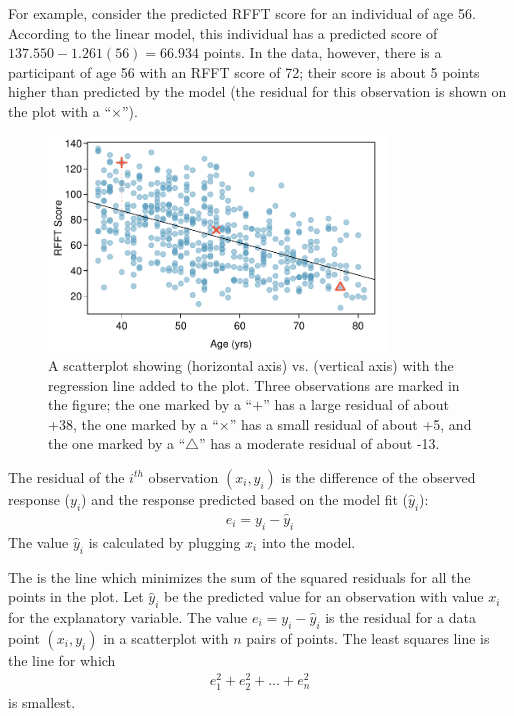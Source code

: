 For example, consider the predicted RFFT score for an individual of age 56. According to the linear model, this individual has a predicted score of $137.550 - 1.261(56) = 66.934$ points. In the data, however, there is a participant of age 56 with an RFFT score of 72; their score is about 5 points higher than predicted by the model (the residual for this observation is shown on the plot with a ``$\times$'').

\begin{figure}[h!]
	\centering
	\includegraphics[width=0.8\textwidth]
	{ch_simple_linear_regression_oi_biostat/figures/statinsResid/statinsResid.pdf}
	\caption{A scatterplot showing  (horizontal axis) vs.  (vertical axis) with the regression line added to the plot. Three observations are marked in the figure; the one marked by a ``$+$'' has a large residual of about +38, the one marked by a ``$\times$'' has a small residual of about +5, and the one marked by a ``$\triangle$'' has a moderate residual of about -13.}
	\label{statinsResid}
\end{figure}

\begin{termBox}{
The residual of the $i^{th}$ observation $(x_i, y_i)$ is the difference of the observed response ($y_i$) and the response predicted based on the model fit ($\widehat{y}_i$):
\begin{eqnarray*}
e_i = y_i - \widehat{y}_i
\end{eqnarray*}
The value $\widehat{y}_i$ is calculated by plugging $x_i$ into the model.}
\end{termBox}

The  is the line which minimizes the sum of the squared residuals for all the points in the plot.  Let $\hat{y}_i$ be the predicted value for an observation with value $x_i$ for the explanatory variable.  The value $e_i = y_i - \hat{y}_i$ is the residual for a data point $(x_i, y_i)$ in a scatterplot with $n$ pairs of points.  The least squares line is the line for which
\begin{eqnarray}
e_{1}^2 + e_{2}^2 + \dots + e_{n}^2
\label{sumOfSquaresForResiduals}
\end{eqnarray}
is smallest.


